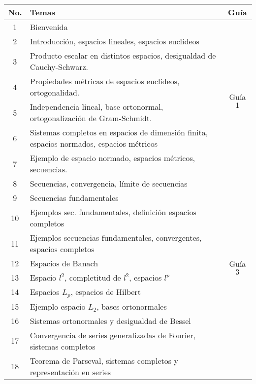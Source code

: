 \vspace{1cm}


\begin{table}[H]
	\centering
	\begin{tabular}{||c|p{13cm}||c||}
		\hline
		\hline
			No. & Temas & Guía \\
		\hline
		\hline
			1  & Bienvenida &  \\
		\hline
			2  & Introducción, espacios lineales, espacios euclídeos &  \\
			3  & Producto escalar en distintos espacios, desigualdad de Cauchy-Schwarz. & \multirow{4}{2cm}{Guía $1$} \\
			4  & Propiedades métricas de espacios euclídeos, ortogonalidad.  &  \\
			5  & Independencia lineal, base ortonormal,  ortogonalización de Gram-Schmidt. &  \\
		\hline
			6  & Sistemas completos en espacios de dimensión finita, espacios normados, espacios métricos & \multirow{4}{2cm}{Guía $2$} \\
			7  & Ejemplo de espacio normado, espacios métricos, secuencias. &  \\
			8  & Secuencias, convergencia, límite de secuencias &  \\
			9  & Secuencias fundamentales &  \\
		\hline
			10 & Ejemplos sec. fundamentales, definición espacios completos & \multirow{7}{2cm}{Guía $3$} \\
			11 & Ejemplos secuencias fundamentales, convergentes, espacios completos &  \\
			12 & Espacios de Banach &  \\
			13 & Espacio $l^2$, completitud de $l^2$, espacios $l^p$ &  \\
			14 & Espacios $L_p$, espacios de Hilbert &  \\
			15 & Ejemplo espacio $L_2$, bases ortonormales &  \\
			16 & Sistemas ortonormales y desigualdad de Bessel &  \\
		\hline
			17 & Convergencia de series generalizadas de Fourier, sistemas completos & \\
			18 & Teorema de Parseval, sistemas completos y representación en series & \\
		\hline
		\hline
	\end{tabular}
\end{table}









